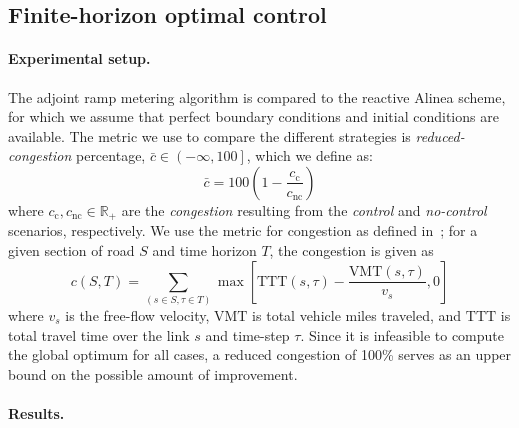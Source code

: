 \subsection{Finite-horizon optimal control\label{sub:Finite-horizon-optimal-control}}
						
						
\paragraph{Experimental setup.}
						
The adjoint ramp metering algorithm is compared to the reactive Alinea
scheme, for which we assume that perfect boundary conditions and initial conditions
are available. The metric we use to compare the different strategies is \emph{reduced-congestion} percentage, $\bar{c} \in \left(-\infty,100\right]$, which we define as:
\[
\bar{c} = 100 \left(1 - \frac{c_\text{c}}{c_{\text{nc}}}\right)
\]where $c_\text{c}, c_{\text{nc}} \in \mathbb{R}_+$ are the \emph{congestion} resulting from the \emph{control} and \emph{no-control} scenarios, respectively. We use the metric for congestion as defined in~\cite{Skabardonis2003}; for a given section of road $S$ and time horizon $T$, the congestion is given as
\[
c\left(S,T\right) = \sum_{\left(s\in S, \tau\in T\right)} \max \left[\text{TTT}\left(s,\tau\right) - \frac{\text{VMT}\left(s, \tau\right)}{v_s}, 0\right]
\] where $v_s$ is the free-flow velocity, $\text{VMT}$ is total vehicle miles traveled, and $\text{TTT}$ is total travel time over the link $s$ and time-step $\tau$. Since it is infeasible to compute the global optimum for all cases, a reduced congestion of 100\% serves as an upper bound on the possible amount of improvement.

\paragraph{Results.}
						
